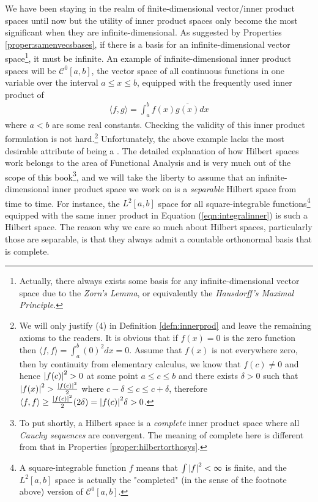 We have been staying in the realm of finite-dimensional vector/inner product spaces until now but the utility of inner product spaces only become the most significant when they are infinite-dimensional. As suggested by Properties \ref{proper:samenvecsbases}, if there is a basis for an infinite-dimensional vector space\footnote{Actually, there always exists some basis for any infinite-dimensional vector space due to the \textit{Zorn's Lemma}, or equivalently the \textit{Hausdorff's Maximal Principle}.}, it must be infinite. An example of infinite-dimensional inner product spaces will be $\mathcal{C}^0[a,b]$, the vector space of all continuous functions in one variable over the interval $a \leq x \leq b$, equipped with the frequently used inner product of
\begin{align}
\langle f,g \rangle = \int_a^b f(x) \overline{g(x)} dx \label{eqn:integralinner}
\end{align}
where $a < b$ are some real constants. Checking the validity of this inner product formulation is not hard.\footnote{We will only justify (4) in Definition \ref{defn:innerprod} and leave the remaining axioms to the readers. It is obvious that if $f(x) = 0$ is the zero function then $\langle f,f \rangle = \int_a^b (0)^2 dx = 0$. Assume that $f(x)$ is not everywhere zero, then by continuity from elementary calculus, we know that $f(c) \neq 0$ and hence $\abs{f(c)}^2 > 0$ at some point $a \leq c \leq b$ and there exists $\delta > 0$ such that $\abs{f(x)}^2 > \frac{\abs{f(c)}^2}{2}$ where $c-\delta \leq c \leq c+\delta$, therefore $\langle f,f \rangle \geq \frac{\abs{f(c)}^2}{2} (2\delta) = \abs{f(c)}^2 \delta > 0$.} 
Unfortunately, the above example lacks the most desirable attribute of being a . The detailed explanation of how Hilbert spaces work belongs to the area of Functional Analysis and is very much out of the scope of this book\footnote{To put shortly, a Hilbert space is a \textit{complete} inner product space where all \textit{Cauchy sequences} are convergent. The meaning of complete here is different from that in Properties \ref{proper:hilbertorthosys}.}, and we will take the liberty to assume that an infinite-dimensional inner product space we work on is a \textit{separable} Hilbert space from time to time. For instance, the $L^2[a,b]$ space for all square-integrable functions\footnote{A square-integrable function $f$ means that $\int \abs{f}^2 < \infty$ is finite, and the $L^2[a,b]$ space is actually the "completed" (in the sense of the footnote above) version of $\mathcal{C}^0[a,b]$.} equipped with the same inner product in Equation (\ref{eqn:integralinner}) is such a Hilbert space. The reason why we care so much about Hilbert spaces, particularly those are separable, is that they always admit a countable orthonormal basis that is complete.
